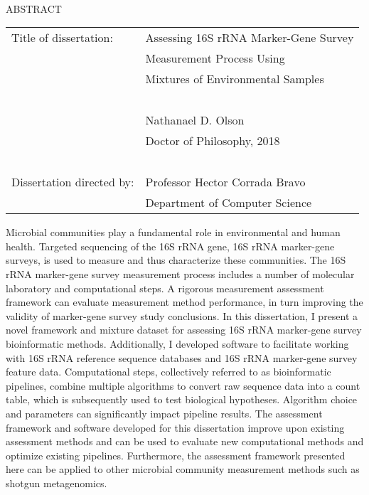 
\hbox{\ }

\renewcommand{\baselinestretch}{1}
\small \normalsize

\begin{center}
\large{{ABSTRACT}}

\vspace{3em}

\end{center}
\hspace{-.15in}
\begin{tabular}{ll}
Title of dissertation:    & {\large  Assessing 16S rRNA Marker-Gene Survey}\\
&                     {\large  Measurement Process Using} \\
&                     {\large  Mixtures of Environmental Samples} \\
\ \\
&                          {\large  Nathanael D. Olson} \\
&                           {\large Doctor of Philosophy, 2018} \\
\ \\
Dissertation directed by: & {\large  Professor Hector Corrada Bravo} \\
&               {\large  Department of Computer Science } \\
\end{tabular}

\vspace{3em}

\renewcommand{\baselinestretch}{2}
\large \normalsize

Microbial communities play a fundamental role in environmental and human health.
Targeted sequencing of the 16S rRNA gene, 16S rRNA marker-gene surveys, is used to measure and thus characterize these communities.
The 16S rRNA marker-gene survey measurement process includes a number of molecular laboratory and computational steps.
A rigorous measurement assessment framework can evaluate measurement method performance, in turn improving the validity of marker-gene survey study conclusions.
In this dissertation, I present a novel framework and mixture dataset for assessing 16S rRNA marker-gene survey bioinformatic methods.
Additionally, I developed software to facilitate working with 16S rRNA reference sequence databases and 16S rRNA marker-gene survey feature data.
Computational steps, collectively referred to as bioinformatic pipelines, combine multiple algorithms to convert raw sequence data into a count table, which is subsequently used to test biological hypotheses.
Algorithm choice and parameters can significantly impact pipeline results.
The assessment framework and software developed for this dissertation improve upon existing assessment methods and can be used to evaluate new computational methods and optimize existing pipelines.
Furthermore, the assessment framework presented here can be applied to other microbial community measurement methods such as shotgun metagenomics.

